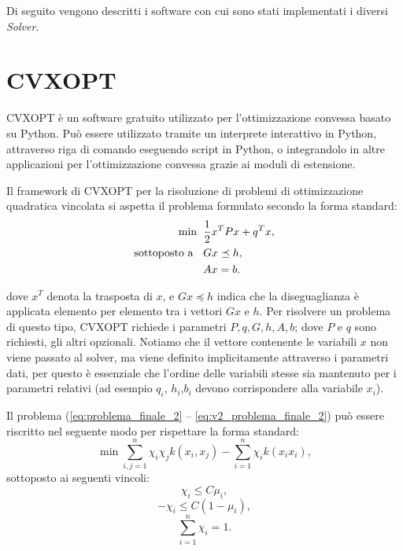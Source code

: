 \documentclass[a4paper,12pt]{report}
\begin{document}
Di seguito vengono descritti i software con cui sono stati implementati i diversi \textit{Solver}.

\section{CVXOPT}
CVXOPT \cite{cvxopt} è un software gratuito utilizzato per l'ottimizzazione convessa basato su Python. Può essere utilizzato tramite un interprete interattivo in Python, attraverso riga di comando eseguendo script in Python, o integrandolo in altre applicazioni per l'ottimizzazione convessa grazie ai moduli di estensione. 

Il framework di CVXOPT per la risoluzione di problemi di ottimizzazione quadratica vincolata si aspetta il problema formulato secondo la forma standard:
\begin{equation*}
\begin{split}
    \min \hspace{0.2cm}&\frac{1}{2}x^{T}Px + q^{T}x,\\ 
    \textrm{sottoposto a } \hspace{0.2cm} &Gx \preceq h,\\
    &Ax = b.
\end{split}
\end{equation*}

\noindent dove $x^{T}$ denota la trasposta di $x$, e $Gx \preceq h$ indica che la diseguaglianza è applicata elemento per elemento tra i vettori $Gx$ e $h$. 
Per risolvere un problema di questo tipo, CVXOPT richiede i parametri ${P,q,G,h,A,b}$; dove $P$ e $q$ sono richiesti, gli altri opzionali. Notiamo che il vettore contenente le variabili $x$ non viene passato al solver, ma viene definito implicitamente attraverso i parametri dati, per questo è essenziale che l'ordine delle variabili stesse sia mantenuto per i parametri relativi (ad esempio $q_i$, $h_i$,$b_i$ devono corrispondere alla variabile $x_i$).

Il problema (\ref{eq:problema_finale_2} -- \ref{eq:v2_problema_finale_2}) può essere riscritto nel seguente modo per rispettare la forma standard: 
\begin{equation}
    \min \displaystyle\sum_{i,j=1}^{n}\chi_i\chi_j k(x_i,x_j) - \displaystyle\sum_{i=1}^{n}\chi_ik(x_ix_i),
    \label{eq:forma_standard}
\end{equation}
sottoposto ai seguenti vincoli:
\begin{equation}
    \chi_i \le C\mu_i,
    \label{eq:vincolo_1_forma_standard}
\end{equation}
\begin{equation}
    -\chi_i \le C(1-\mu_i),
    \label{eq:vincolo_2_forma_standard}
\end{equation}
\begin{equation}
    \displaystyle\sum_{i=1}^{n}\chi_i = 1.
    \label{eq:vincolo_3_forma_standard}
\end{equation}
\end{document}
